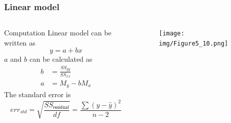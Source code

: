 \documentclass[10pt, compress]{beamer}
\begin{document}
\begin{frame}
    \frametitle{Linear model}
    \begin{columns}
        \begin{block}{Computation}
            Linear model can be written as
            \begin{equation}
                y = a + bx
            \end{equation}
            $a$ and $b$ can be calculated as
            \begin{align}
                b & = \frac{SS_{yy}}{SS_{xx}} \\
                a & = M_{y} - bM_{x}
            \end{align}
            The standard error is
            \begin{equation}
                err_{std} = \sqrt{\frac{SS_{\mathsf{residual}}}{df}} = \frac{\sum (y- \hat{y})^2}{n-2}
            \end{equation}
        \end{block}
        \begin{block}{}
            \begin{figure}
                \begin{center}
                    \texttt{[image: img/Figure5\_10.png]}
                \end{center}
            \end{figure}
        \end{block}
    \end{columns}
\end{frame}
\end{document}
